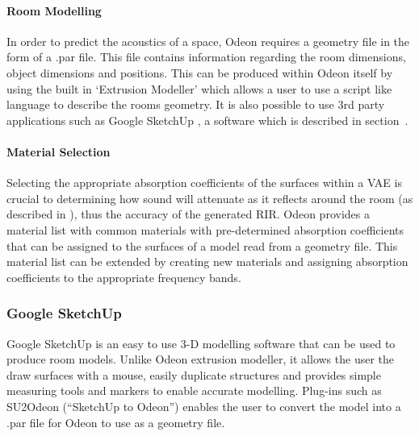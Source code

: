 \documentclass[../../main.tex]{subfiles}
\begin{document}
		\paragraph{Room Modelling}

			In order to predict the acoustics of a space, Odeon requires a geometry file in the form of a .par file. This file contains information regarding the room dimensions, object dimensions and positions. This can be produced within Odeon itself by using the built in `Extrusion Modeller' which allows a user to use a script like language to describe the rooms geometry. It is also possible to use 3rd party applications such as Google SketchUp \cite{SKU}, a software which is described in section~.

		\paragraph{Material Selection}

			Selecting the appropriate absorption coefficients of the surfaces within a \ac{VAE} is crucial to determining how sound will attenuate as it reflects around the room (as described in ), thus the accuracy of the generated \ac{RIR}. Odeon provides a material list with common materials with pre-determined absorption coefficients that can be assigned to the surfaces of a model read from a geometry file. This material list can be extended by creating new materials and assigning absorption coefficients to the appropriate frequency bands.

	\subsubsection{Google SketchUp}\label{GSU}
		Google SketchUp \cite{SKU} is an easy to use 3-D modelling software that can be used to produce room models. Unlike Odeon extrusion modeller, it allows the user the draw surfaces with a mouse, easily duplicate structures and provides simple measuring tools and markers to enable accurate modelling. Plug-ins such as SU2Odeon (``SketchUp to Odeon'') \cite{SU2Odeon} enables the user to convert the model into a .par file for Odeon to use as a geometry file.
\end{document}

